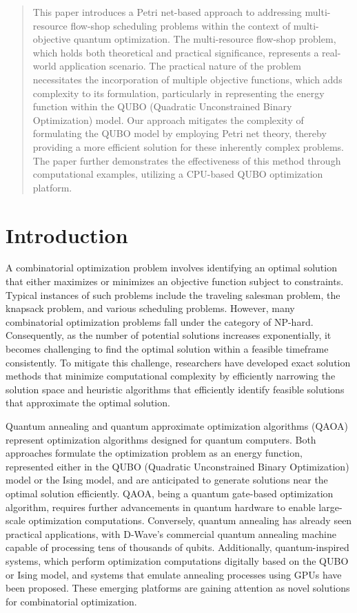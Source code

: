 \documentclass[conference]{IEEEtran}
\begin{document}
\maketitle


\begin{abstract}
This paper introduces a Petri net-based approach to addressing multi-resource flow-shop scheduling problems within the context of multi-objective quantum optimization. The multi-resource flow-shop problem, which holds both theoretical and practical significance, represents a real-world application scenario. The practical nature of the problem necessitates the incorporation of multiple objective functions, which adds complexity to its formulation, particularly in representing the energy function within the QUBO (Quadratic Unconstrained Binary Optimization) model.
Our approach mitigates the complexity of formulating the QUBO model by employing Petri net theory, thereby providing a more efficient solution for these inherently complex problems. The paper further demonstrates the effectiveness of this method through computational examples, utilizing a CPU-based QUBO optimization platform.
\end{abstract}

\section{Introduction}
A combinatorial optimization problem involves identifying an optimal solution that either maximizes or minimizes an objective function subject to constraints. Typical instances of such problems include the traveling salesman problem, the knapsack problem, and various scheduling problems. However, many combinatorial optimization problems fall under the category of NP-hard. Consequently, as the number of potential solutions increases exponentially, it becomes challenging to find the optimal solution within a feasible timeframe consistently. To mitigate this challenge, researchers have developed exact solution methods that minimize computational complexity by efficiently narrowing the solution space and heuristic algorithms that efficiently identify feasible solutions that approximate the optimal solution.

Quantum annealing and quantum approximate optimization algorithms (QAOA) represent optimization algorithms designed for quantum computers. Both approaches formulate the optimization problem as an energy function, represented either in the QUBO (Quadratic Unconstrained Binary Optimization) model or the Ising model, and are anticipated to generate solutions near the optimal solution efficiently. QAOA, being a quantum gate-based optimization algorithm, requires further advancements in quantum hardware to enable large-scale optimization computations. Conversely, quantum annealing has already seen practical applications, with D-Wave's commercial quantum annealing machine capable of processing tens of thousands of qubits. Additionally, quantum-inspired systems, which perform optimization computations digitally based on the QUBO or Ising model, and systems that emulate annealing processes using GPUs have been proposed. These emerging platforms are gaining attention as novel solutions for combinatorial optimization.
\end{document}
